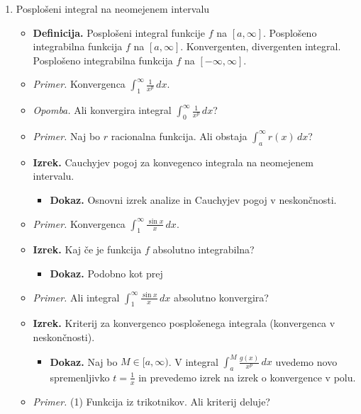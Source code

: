 \begin{enumerate}
    \newpage
    \item Posplošeni integral na neomejenem intervalu
    \begin{itemize}
        \item \colorbox{purple!30}{\textbf{Definicija.}} Posplošeni integral funkcije $f$ na $[a, \infty]$. Posplošeno integrabilna funkcija $f$ na $[a, \infty]$. Konvergenten, divergenten integral. Posplošeno integrabilna funkcija $f$ na $[- \infty, \infty]$.
        \item \colorbox{yellow!30}{\emph{Primer.}} Konvergenca $\displaystyle \int_{1}^{\infty} \frac{1}{x^p}  \,dx $.
        \item \colorbox{yellow!30}{\emph{Opomba.}} Ali konvergira integral $\displaystyle \int_{0}^{\infty} \frac{1}{x^p}  \,dx $?
        \item \colorbox{yellow!30}{\emph{Primer.}} Naj bo $r$ racionalna funkcija. Ali obstaja $\displaystyle \int_{a}^{\infty} r(x) \,dx $?
        \item \colorbox{blue!30}{\textbf{Izrek.}} Cauchyjev pogoj za konvegenco integrala na neomejenem intervalu.
        \begin{itemize}
            \item \colorbox{green!30}{\textbf{Dokaz.}} Osnovni izrek analize in Cauchyjev pogoj v neskončnosti.
        \end{itemize}
        \item \colorbox{yellow!30}{\emph{Primer.}} Konvergenca $\displaystyle \int_{1}^{\infty}  \frac{\sin x}{x} \,dx $.
        \item \colorbox{blue!30}{\textbf{Izrek.}} Kaj če je funkcija $f$ absolutno integrabilna?
        \begin{itemize}
            \item \colorbox{green!30}{\textbf{Dokaz.}} Podobno kot prej
        \end{itemize}
        \item \colorbox{yellow!30}{\emph{Primer.}} Ali integral $\displaystyle \int_{1}^{\infty}  \frac{\sin x}{x} \,dx $ absolutno konvergira?
        \item \colorbox{blue!30}{\textbf{Izrek.}} Kriterij za konvergenco posplošenega integrala (konvergenca v neskončnosti).
        \begin{itemize}
            \item \colorbox{green!30}{\textbf{Dokaz.}} Naj bo $M \in [a, \infty)$. V integral $\int_{a}^{M}\frac{g(x)}{x^p} \, dx$ uvedemo novo spremenljivko $t = \frac{1}{x}$ in prevedemo izrek na izrek o konvergence v polu.
        \end{itemize}
        \item \colorbox{yellow!30}{\emph{Primer.}} (1) Funkcija iz trikotnikov. Ali kriterij deluje?
        

\end{itemize}
\end{enumerate}
